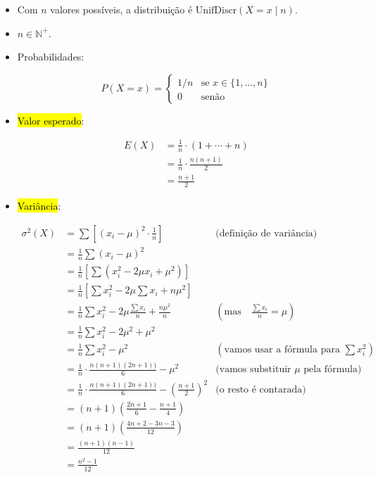 \documentclass[
  11pt]{report}
\begin{document}
\begin{itemize}
\item
  Com $n$ valores possíveis, a distribuição é $\text{UnifDiscr}(X = x \mid n)$.
\item
  $n \in \mathbb{N}^+$.
\item
  Probabilidades:

  \[
  P(X = x) = \begin{cases}
        1/n &\text{se } x \in \{1, \ldots, n\} \\
        0   &\text{senão}
      \end{cases}
  \]
\item
  {\hl{Valor esperado}}:

  \[
  \begin{aligned}
  E(X) &= \frac{1}{n} \cdot (1 + \cdots + n)\\ 
       &= \frac{1}{n} \cdot \frac{n(n+1)}{2}\\ 
       &= \frac{n+1}{2}
  \end{aligned}
  \]
\item
  {\hl{Variância}}:

  \[
  \begin{aligned}
  \sigma^2(X) &= \sum \left[(x_i - \mu)^2 \cdot \frac1n \right]
                  & \text{(definição de variância)}\\
              &= \frac1n \sum (x_i - \mu)^2 \\
              &= \frac1n \left[ \sum (x_i^2 -2\mu x_i + \mu^2) \right] \\
              &= \frac1n \left[ \sum x_i^2 - 2\mu \sum x_i + n\mu^2 \right] \\
              &= \frac1n \sum x_i^2 - 2\mu \frac{\sum x_i}{n} + \frac{n\mu^2}{n}  
                   & \left(\text{mas}\quad \frac{\sum x_i}{n} = \mu\right)\\
              &= \frac1n \sum x_i^2 - 2\mu^2 + \mu^2\\
              &= \frac1n \sum x_i^2 - \mu^2  
                  & \left(\text{vamos usar a fórmula para } \sum x_i^2 \right)\\
              &= \frac1n \cdot \frac{n(n+1)(2n+1))}{6} - \mu^2  
                  & \text{(vamos substituir } \mu \text{ pela fórmula)}\\
              &= \frac1n \cdot \frac{n(n+1)(2n+1))}{6} - \left(\frac{n+1}{2}\right)^2  
                  & \text{(o resto é contarada)}\\
              &= (n+1) \left( \frac{2n+1}{6} - \frac{n+1}{4}\right) \\
              &= (n+1) \left( \frac{4n + 2 -3n - 3}{12}\right) \\
              &= \frac{(n+1)(n-1)}{12} \\
              &= \frac{n^2 - 1}{12}
  \end{aligned}
  \]
\end{itemize}
\end{document}
